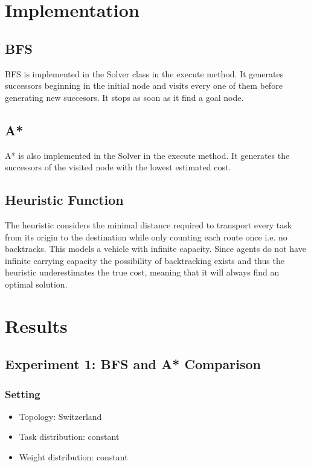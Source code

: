 \documentclass[11pt]{article}
\begin{document}
\section{Implementation}

\subsection{BFS}
BFS is implemented in the Solver class in the execute method. It generates
successors beginning in the initial node and visits every one of them before
generating new succesors. It stops as soon as it find a goal node.

\subsection{A*}
A* is also implemented in the Solver in the execute method. It generates the
successors of the visited node with the lowest estimated cost.

\subsection{Heuristic Function}
The heuristic considers the minimal distance required to transport every task
from its origin to the destination while only counting each route once i.e. no
backtracks. This models a vehicle with infinite capacity. Since agents do not
have infinite carrying capacity the possibility of backtracking exists and thus
the heuristic underestimates the true cost, meaning that it will always find an
optimal solution.

\section{Results}

\subsection{Experiment 1: BFS and A* Comparison}

\subsubsection{Setting}
\begin{itemize}
\item Topology: Switzerland
\item Task distribution: constant
\item Weight distribution: constant
\end{itemize}
\end{document}

